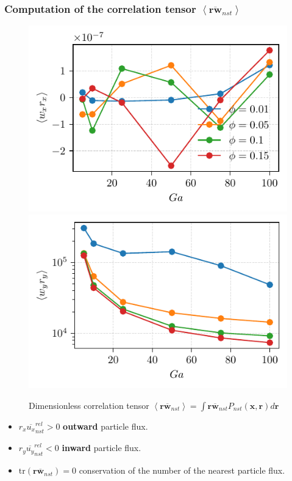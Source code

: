 \documentclass{sintefbeamer}
\newcommand{\avg}[1]{\left<#1\right>}
\newcommand{\nstavg}[1]{\overline{#1}_{nst}}
\newcommand{\nstrelavg}[1]{\overline{#1}_{nst}^{rel}}
\begin{document}
\begin{frame}
  \frametitle{Computation of the correlation tensor $\avg{\nstavg{\textbf{rw}}}$ }
  \begin{figure}
    \begin{centering}
      \includegraphics[height=0.25\textwidth]{image/HOMOGENEOUS/fPA/URxx.pdf}
      \includegraphics[height=0.25\textwidth]{image/HOMOGENEOUS/fPA/URyy.pdf}
      \caption{Dimensionless correlation tensor $\avg{\textbf{r}\nstavg{\textbf{w}}} =  \int \textbf{r}\nstavg{\textbf{w}} P_{nst}(\textbf{x},\textbf{r})d\textbf{r}$}
    \end{centering}
  \end{figure}

  \begin{itemize}
    \item $r_x\nstrelavg{u_x} > 0$ \textbf{outward} particle flux.  
    \item $r_y\nstrelavg{u_y} < 0$ \textbf{inward} particle flux. 
    \item $\text{tr}\left(\textbf{r}\nstavg{\textbf{w}}\right) = 0$ conservation of the number of the nearest particle flux. 
  \end{itemize} 
\end{frame}
\end{document}
